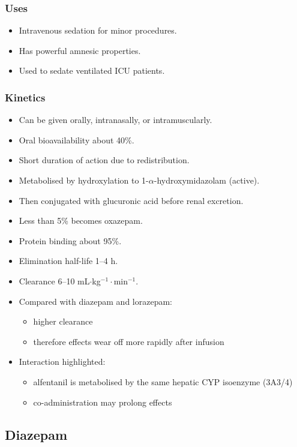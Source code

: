 \documentclass[11pt,a4paper]{article}
\begin{document}
\subsubsection{Uses}
\begin{itemize}
  \item Intravenous sedation for minor procedures.
  \item Has powerful amnesic properties.
  \item Used to sedate ventilated ICU patients.
\end{itemize}

\subsubsection{Kinetics}
\begin{itemize}
  \item Can be given orally, intranasally, or intramuscularly.
  \item Oral bioavailability about 40\%.
  \item Short duration of action due to redistribution.
  \item Metabolised by hydroxylation to 1-$\alpha$-hydroxymidazolam (active).
  \item Then conjugated with glucuronic acid before renal excretion.
  \item Less than 5\% becomes oxazepam.
  \item Protein binding about 95\%.
  \item Elimination half-life 1--4 h.
  \item Clearance 6--10 mL$\cdot$kg$^{-1}\cdot$min$^{-1}$.
  \item Compared with diazepam and lorazepam:
  \begin{itemize}
    \item higher clearance
    \item therefore effects wear off more rapidly after infusion
  \end{itemize}
  \item Interaction highlighted:
  \begin{itemize}
    \item alfentanil is metabolised by the same hepatic CYP isoenzyme (3A3/4)
    \item co-administration may prolong effects
  \end{itemize}
\end{itemize}

\subsection{Diazepam}
\end{document}
